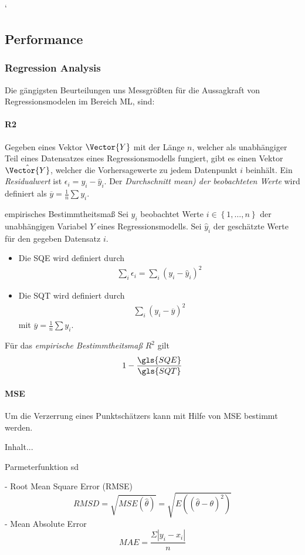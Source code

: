`


\subsection{Performance}
\subsubsection{Regression Analysis}
Die gängigsten Beurteilungen uns Messgrößten für die Aussagkraft von Regressionsmodelen im Bereich \gls{ML},  sind:
\paragraph{\gls{R2}}
Gegeben eines Vektor $\Vector{Y}$ mit der Länge $n$, welcher als unabhängiger Teil eines Datensatzes eines Regressionsmodells fungiert, gibt es einen Vektor $\hat{\Vector{Y}}$, welcher die Vorhersagewerte zu jedem Datenpunkt $i$ beinhält. Ein \textit{Residualwert} ist $
\epsilon_i = y_i - \hat{y}_i$. Der \textit{Durchschnitt mean) der beobachteten Werte} wird definiert als $\overline{y}=\frac{1}{n}\sum y_i$. 
\begin{definition}{empirisches Bestimmtheitsmaß}{}
	Sei $y_i$ beobachtet Werte $i\in \left\lbrace 1, \dots, n\right\rbrace$ der unabhängigen Variabel $Y$  eines Regressionsmodells. Sei $\hat{y}_i$ der geschätzte Werte für den gegeben Datensatz $i$.
	\begin{itemize}
		\item Die \gls{SQE} wird definiert durch 
		\begin{align}
			\sum_i \epsilon_i = \sum_i (y_i - \hat{y}_i)^2 
		\end{align}
		\item Die \gls{SQT} wird definiert durch
		\begin{align}
			\sum_i (y_i - \overline{y})^2
		\end{align}
		mit $\overline{y} = \frac{1}{n}\sum y_i$.
	\end{itemize} 
Für das \textit{empirische Bestimmtheitsmaß} $R^2$ gilt
\begin{align}
	1 - \frac{\gls{SQE}}{\gls{SQT}}
	\end{align}
\end{definition}

\paragraph{\gls{MSE}} Um die Verzerrung eines Punktschätzers kann mit Hilfe von \gls{MSE} bestimmt werden. 
\begin{definition}
	Inhalt...
\end{definition} 
\begin{lemma-definition}{Parmeterfunktion}{}
	sd
\end{lemma-definition}


- Root Mean Square Error (RMSE) $$RMSD= \sqrt{MSE(\hat{\theta})} = \sqrt{E((\hat{\theta}-\theta)^2)}$$
- Mean Absolute Error $$MAE = \frac{\Sigma |y_i - x_i|}{n}$$
